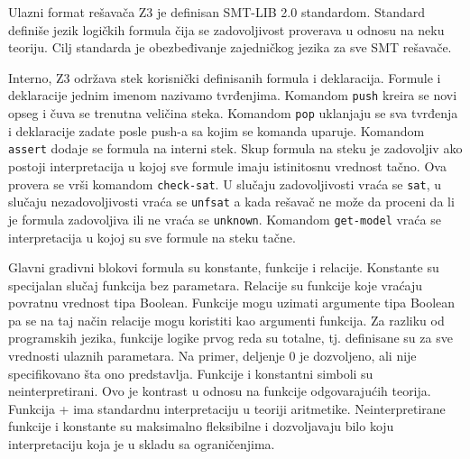 \documentclass[12pt,oneside]{memoir}
\newtheorem{primer}{Primer}
\begin{document}
\par
Ulazni format rešavača Z3 je definisan SMT-LIB 2.0 standardom. Standard definiše jezik logičkih formula čija se zadovoljivost proverava u odnosu na neku teoriju. Cilj standarda je obezbeđivanje zajedničkog jezika za sve SMT rešavače. 
\par
Interno, Z3 održava stek korisnički definisanih formula i deklaracija. Formule i deklaracije jednim imenom nazivamo tvrđenjima. Komandom \texttt{push} kreira se novi opseg i čuva se trenutna veličina steka. Komandom \texttt{pop} uklanjaju se sva tvrđenja i deklaracije zadate posle push-a sa kojim se komanda uparuje. Komandom \texttt{assert} dodaje se formula na interni stek. Skup formula na steku je zadovoljiv ako postoji interpretacija u kojoj sve formule imaju istinitosnu vrednost tačno. Ova provera se vrši komandom \texttt{check-sat}. U slučaju zadovoljivosti vraća se \texttt{sat}, u slučaju nezadovoljivosti vraća se \texttt{unfsat} a kada rešavač ne može da proceni da li je formula zadovoljiva ili ne vraća se \texttt{unknown}. Komandom \texttt{get-model} vraća se interpretacija u kojoj su sve formule na steku tačne. 
\par
Glavni gradivni blokovi formula su konstante, funkcije i relacije. Konstante su specijalan slučaj funkcija bez parametara. Relacije su funkcije koje vraćaju povratnu vrednost tipa Boolean. Funkcije mogu uzimati argumente tipa Boolean pa se na taj način relacije mogu koristiti kao argumenti funkcija. Za razliku od programskih jezika, funkcije logike prvog reda su totalne, tj. definisane su za sve vrednosti ulaznih parametara. Na primer, deljenje 0 je dozvoljeno, ali nije specifikovano šta ono predstavlja. Funkcije i konstantni simboli su neinterpretirani. Ovo je kontrast u odnosu na funkcije odgovarajućih teorija. Funkcija + ima standardnu interpretaciju u teoriji aritmetike. Neinterpretirane funkcije i konstante su maksimalno fleksibilne i dozvoljavaju bilo koju interpretaciju koja je u skladu sa ograničenjima. 

\end{document}
